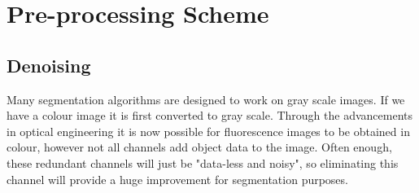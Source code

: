 \section{Pre-processing Scheme}
\label{sec:preprocessscheme}



\subsection{Denoising}
\label{sec:PoissonDenoising}

\begin{definition}
	Many segmentation algorithms are designed to work on gray scale images. If we have a colour image it is first converted to gray scale. Through the advancements in optical engineering it is now possible for fluorescence images to be obtained in colour, however not all channels add object data to the image. 
	Often enough, these redundant channels will just be "data-less and noisy", so eliminating this channel will provide a huge improvement for segmentation purposes.
\end{definition}


